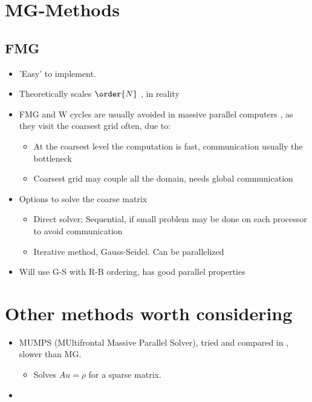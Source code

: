 


\section{MG-Methods}

	\subsection{FMG}
		\begin{itemize}
			\item 'Easy' to implement.
			\item Theoretically scales \(\order{N}\) \citep{Press1987}, in reality
			\item FMG and W cycles are usually avoided in massive parallel computers \citep{chow_survey_2006}, as they visit the coarsest grid often, due to:
				\begin{itemize}
					\item At the coarsest level the computation is fast, communication usually the bottleneck
					\item Coarsest grid may couple all the domain, needs global communication
				\end{itemize}
			\item Options to solve the coarse matrix \citep{chow_survey_2006}
				\begin{itemize}
					\item Direct solver: Sequential, if small problem may be done on each processor to avoid communication
					\item Iterative method, Gauss-Seidel. Can be parallelized
				\end{itemize}
			\item Will use G-S with R-B ordering, has good parallel properties
		\end{itemize}


\section{Other methods worth considering}
		\begin{itemize}
			\item MUMPS (MUltifrontal Massive Parallel Solver), tried and compared in \cite{Kacem2012}, slower than MG.
				\begin{itemize}
					\item Solves \(Au = \rho\) for a sparse matrix.
				\end{itemize}
			\item

		\end{itemize}














